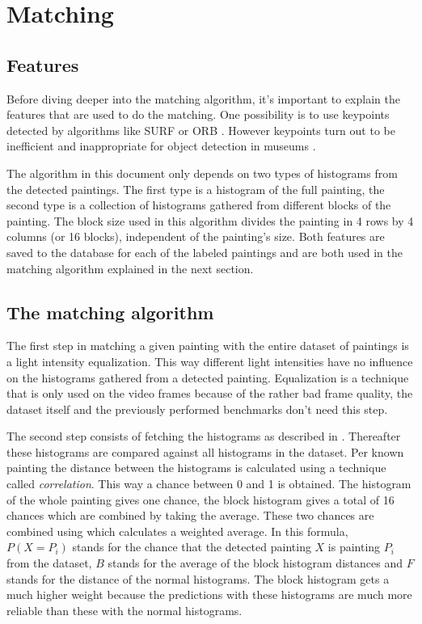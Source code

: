 \section{Matching}
\label{sec:matching}

\subsection{Features}
\label{subsec:the-features}

Before diving deeper into the matching algorithm, it's important to explain the features that are used to do the matching. One possibility is to use keypoints detected by algorithms like SURF \cite{bay2006surf} or ORB \cite{rublee2011orb}. However keypoints turn out to be inefficient and inappropriate for object detection in museums \cite{bay2006interactive}.

The algorithm in this document only depends on two types of histograms from the detected paintings. The first type is a histogram of the full painting, the second type is a collection of histograms gathered from different blocks of the painting. The block size used in this algorithm divides the painting in 4 rows by 4 columns (or 16 blocks), independent of the painting's size. Both features are saved to the database for each of the labeled paintings and are both used in the matching algorithm explained in the next section.

\subsection{The matching algorithm}
\label{subsec:matching-algo}

The first step in matching a given painting with the entire dataset of paintings is a light intensity equalization. This way different light intensities have no influence on the histograms gathered from a detected painting. Equalization is a technique that is only used on the video frames because of the rather bad frame quality, the dataset itself and the previously performed benchmarks don't need this step. \cite{patel2013comparative}

The second step consists of fetching the histograms as described in . Thereafter these histograms are compared against all histograms in the dataset. Per known painting the distance between the histograms is calculated using a technique called \emph{correlation}. This way a chance between 0 and 1 is obtained. The histogram of the whole painting gives one chance, the block histogram gives a total of 16 chances which are combined by taking the average. These two chances are combined using  which calculates a weighted average. In this formula, $P(X = P_{i})$ stands for the chance that the detected painting $X$ is painting $P_{i}$ from the dataset, $B$ stands for the average of the block histogram distances and $F$ stands for the distance of the normal histograms. The block histogram gets a much higher weight because the predictions with these histograms are much more reliable than these with the normal histograms.

